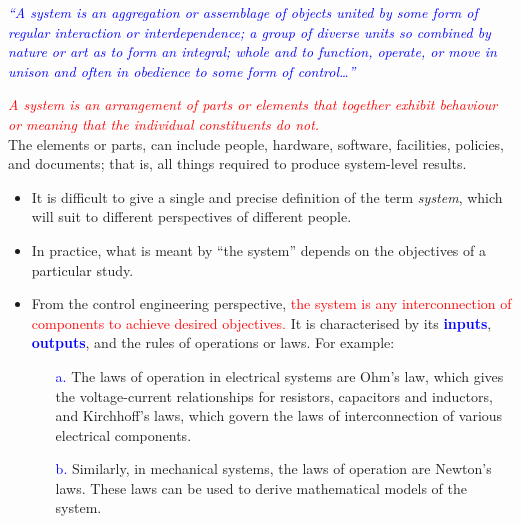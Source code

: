 \documentclass[
  12pt,
  a4paper,
]{report}
\begin{document}
\begin{tcolorbox}[colback=boxbodycol,colframe=boxheadcol, title=According to the Webster's Dictionary]
    \label{fig:system-def-webster}
    \textcolor{blue}{\emph{``A system is an aggregation or assemblage of objects united by some form of regular interaction or interdependence; a group of diverse units so combined by nature or art as to form an integral; whole and to function, operate, or move in unison and often in obedience to some form of control\dots''}}
\end{tcolorbox}
\begin{tcolorbox}[colback=boxbodycol,colframe=boxheadcol, title=According to the International Council on Systems Engineering (INCOSE)]
    \label{fig:system-def-incose}
    \textcolor{red}{\emph{A system is an arrangement of parts or elements that together exhibit behaviour or meaning that the individual constituents do not.}}\\ 
    The elements or parts, can include people, hardware, software, facilities, policies, and documents; that is, all things required to produce system-level results.
\end{tcolorbox}
\begin{center}
    \begin{itemize}
        \item It is difficult to give a single and precise definition of the term \emph{system}, which will suit to different perspectives of different people. \\
        \item In practice, what is meant by ``the system'' depends on the objectives of a particular study.\\
        \item From the control engineering perspective, \textcolor{red}{the system is any interconnection of components to achieve desired objectives.} It is characterised by its \textcolor{blue}{\textbf{inputs}}, \textcolor{blue}{\textbf{outputs}}, and the rules of operations or laws. For example:
              \begin{itemize}
                  \item[\textcolor{blue}{a.}] The laws of operation in electrical systems are Ohm's law, which gives the voltage-current relationships for resistors, capacitors and inductors, and Kirchhoff's laws, which govern the laws of interconnection of various electrical components.
                  \item[\textcolor{blue}{b.}] Similarly, in mechanical systems, the laws of operation are Newton's laws. These laws can be used to derive mathematical models of the system.
              \end{itemize}
    \end{itemize}
\end{center}
\newpage
\end{document}
